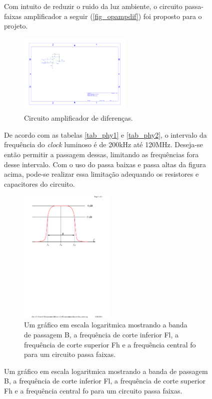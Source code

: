 \begin{table}[h!]
\begin{figure}[htb]
	Com intuito de reduzir o ruido da luz ambiente, o circuito passa-faixas amplificador a seguir (\autoref{fig_opampdif}) foi proposto para o projeto.
	
	\begin{figure}[h!]
		\caption{\label{fig_opampdif}Circuito amplificador de diferenças.}
		\centering
		\includegraphics[width=0.6\textwidth, trim={5cm 12.29cm 17.6cm 4.3cm},clip]{opamp-dif2.pdf}
	\end{figure}
	
	De acordo com as tabelas \ref{tab_phy1} e \ref{tab_phy2}, o intervalo da frequência do \textit{clock} luminoso é de 200kHz até 120MHz. Deseja-se então  permitir a passagem dessas, limitando as frequências fora desse intervalo. Com o uso do passa baixas e passa altas da figura acima, pode-se realizar essa limitação adequando os resistores e capacitores do circuito.
	
	\begin{figure}[htb]
		\caption{\label{fig_frequenciacentral}Um gráfico em escala logaritmica mostrando a banda de passagem B, a frequência de corte inferior Fl, a frequência de corte superior Fh e a frequência central fo para um circuito passa faixas.}
		\centering
		\includegraphics[width=0.5\textwidth, trim={4.5cm 17cm 3.3cm 2cm},clip]{freq-corte.pdf}
	\end{figure}
	

\end{figure}
\end{table}
